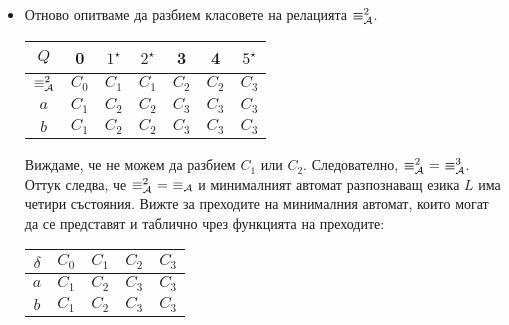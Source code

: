 \begin{extra2}
\begin{example}
\begin{itemize}
    Имаме, че $0 \equiv^1_\A 3$, но $0 \not\equiv^2_\A 3$. Следователно $\equiv^1_\A\ \neq\ \equiv^2_\A$.
    Класовете на еквивалентност на $\equiv^2_\A$ са следните:
    \begin{align*}
      & C_0 \df \{0\},\\
      & C_1 \df \{1,2\},\\
      & C_2 \df \{3,4\},\\
      & C_3 \df \{5\}.
    \end{align*}
  \item
    Отново опитваме да разбием класовете на релацията $\equiv^2_\A$.

      \begin{tabular}{|c|c|c|c|c|c|c|}
        \hline
        $Q$ & 0 & $1^\star$ & $2^\star$ & 3 & 4 & $5^\star$ \\
        \hline
        \hline
        $\equiv^2_\A$ & $C_0$ & $C_1$ & $C_1$ & $C_2$ & $C_2$ & $C_3$\\
        \hline
        $a$ & $C_1$ & $C_2$ & $C_2$ & $C_3$ & $C_3$ & $C_3$\\
        \hline
        $b$ & $C_1$ & $C_2$ & $C_2$ & $C_3$ & $C_3$ & $C_3$\\
        \hline
      \end{tabular}
      
      Виждаме, че не можем да разбием $C_1$ или $C_2$.
      Следователно, $\equiv^2_\A\ =\ \equiv^3_\A$.
      Оттук следва, че $\equiv^2_{\mathcal{A}}\ =\ \equiv_{\mathcal{A}}$ и минималният автомат разпознаващ езика $L$
      има четири състояния. Вижте  за преходите на минималния автомат,
      които могат да се представят и таблично чрез функцията на преходите:

      \begin{tabular}{|c|c|c|c|c|}
        \hline
        $\delta$ & $C_0$ & $C_1$ & $C_2$ & $C_3$ \\
        \hline
        $a$ & $C_1$ & $C_2$ & $C_3$ & $C_3$ \\
        \hline
        $b$ & $C_1$ & $C_2$ & $C_3$ & $C_3$ \\
        \hline
      \end{tabular}
    \end{itemize}

    \begin{figure}[H]
      \centering
\end{figure}
\end{example}
\end{extra2}
